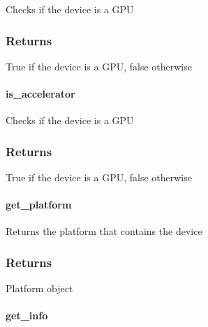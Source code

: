 \documentclass[letterpaper,10pt,english]{sphinxmanual}
\begin{document}
Checks if the device is a GPU
\subsubsection*{Returns}

True if the device is a GPU, false otherwise


\paragraph{is\_accelerator}
\label{\detokenize{programming-interface/runtime/device:is-accelerator}}
\begin{sphinxVerbatim}[commandchars=\\\{\}]
  
\end{sphinxVerbatim}

Checks if the device is a GPU
\subsubsection*{Returns}

True if the device is a GPU, false otherwise


\paragraph{get\_platform}
\label{\detokenize{programming-interface/runtime/device:get-platform}}
\begin{sphinxVerbatim}[commandchars=\\\{\}]
  
\end{sphinxVerbatim}

Returns the platform that contains the device
\subsubsection*{Returns}

Platform object


\paragraph{get\_info}
\label{\detokenize{programming-interface/runtime/device:get-info}}
\begin{sphinxVerbatim}[commandchars=\\\{\}]
  
  
 
\end{sphinxVerbatim}
\end{document}
